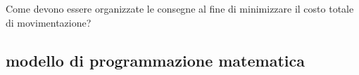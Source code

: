 \documentclass[11pt]{article}
\begin{document}
Come devono essere organizzate le consegne al fine di minimizzare il costo totale di movimentazione?


    \hypertarget{modello-di-programmazione-matematica}{%
\subsection{modello di programmazione
matematica}\label{modello-di-programmazione-matematica}}


\begin{figure}
    \centering
    \hfill
\end{figure}
\end{document}
